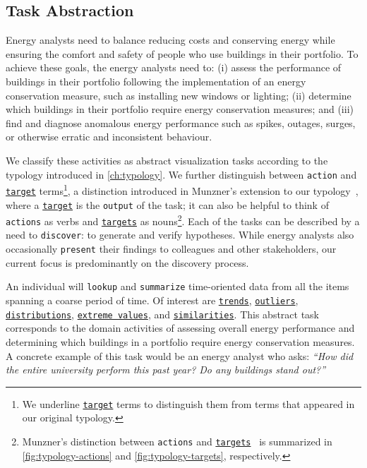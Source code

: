 
\subsection{Task Abstraction}
\label{emu:task-abstractions}


Energy analysts need to balance reducing costs and conserving energy while ensuring the comfort and safety of people who use buildings in their portfolio. 
To achieve these goals, the energy analysts need to: (i) assess the performance of buildings in their portfolio following the implementation of an energy conservation measure, such as installing new windows or lighting; (ii) determine which buildings in their portfolio require energy conservation measures; and (iii) find and diagnose anomalous energy performance such as spikes, outages, surges, or otherwise erratic and inconsistent behaviour.

We classify these activities as abstract visualization tasks according to the typology introduced in \autoref{ch:typology}.
We further distinguish between {\tt action} and \underline{{\tt target}} terms\footnote{We underline \underline{{\tt target}} terms to distinguish them from terms that appeared in our original typology.}, a distinction introduced in Munzner's extension to our typology~\cite{Munzner2014}, where a \underline{{\tt target}} is the {\tt output} of the task; it can also be helpful to think of {\tt actions} as verbs and \underline{{\tt targets}} as nouns\footnote{Munzner's distinction between {\tt actions} and \underline{{\tt targets}}~\cite{Munzner2014} is summarized in \autoref{fig:typology-actions} and \autoref{fig:typology-targets}, respectively.}.
Each of the tasks can be described by a need to {\tt discover}: to generate and verify hypotheses.
While energy analysts also occasionally {\tt present} their findings to colleagues and other stakeholders, our current focus is predominantly on the discovery process. 

 An individual will {\tt lookup} and {\tt summarize} time-oriented data from all the items spanning a coarse period of time. 
Of interest are \underline{{\tt trends}}, \underline{{\tt outliers}}, \underline{{\tt distributions}}, \underline{{\tt extreme values}}, and \underline{{\tt similarities}}. 
This abstract task corresponds to the domain activities of assessing overall energy performance and determining which buildings in a portfolio require energy conservation measures. 
A concrete example of this task would be an energy analyst who asks: {\it ``How did the entire university perform this past year? Do any buildings stand out?''}

